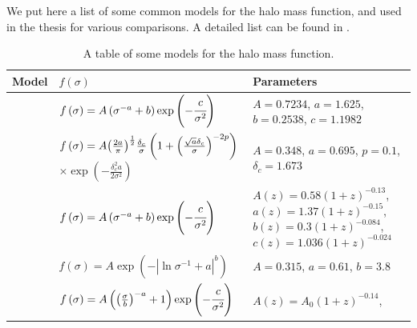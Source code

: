 We put here a list of some common models for the halo mass function, and
used in the thesis for various comparisons. A detailed list can be found in
\citet{Murray+13}.
%
\begin{table}[htb]
    \centering
    \caption{A table of some models for the halo mass
    function.\label{tab:hmf}}
    \begin{tabular}{cp{6.5cm}p{5cm}}
        \toprule
        Model & $f \left(\sigma\right)$ & Parameters\\
        \midrule
        \citet{Warren+06} &
        $f\left(\sigma\right)=
        A\left(\sigma^{-a}+b\right)\exp\left(-\cfrac{c}{\sigma^2}\right)$ &
        $A=0.7234$, \newline
        $a=1.625$, \newline
        $b=0.2538$, \newline
        $c=1.1982$
        \\
        \citet{Courtin+11} &
        $f\left(\sigma\right)=
        A{\left(\frac{2a}{\pi}\right)}^{\frac{1}{2}}
        \frac{\delta_c}{\sigma}\left(1+
        {\left(\frac{\sqrt{a}\delta_c}{\sigma}\right)}^{-2p}\right)$\newline
        $\times\exp\left(-\frac{\delta_c^2{a}}{2\sigma^2}\right)$ &
        $A=0.348$, \newline
        $a=0.695$, \newline
        $p=0.1$, \newline
        $\delta_c=1.673$ \\
        \citet{Crocce+10} &
        $f\left(\sigma\right)=
        A\left(\sigma^{-a}+b\right)\exp\left(-\cfrac{c}{\sigma^2}\right)$ &
        $A\left(z\right)=0.58{\left(1+z\right)}^{-0.13}$,\newline
        $a\left(z\right)=1.37{\left(1+z\right)}^{-0.15}$,\newline
        $b\left(z\right)=0.3{\left(1+z\right)}^{-0.084}$,\newline
        $c\left(z\right)=1.036{\left(1+z\right)}^{-0.024}$
        \\
        \citet{Jenkins+01} &
        $f\left(\sigma\right)=
        A\exp\left(-\left|\ln\sigma^{-1}+a\right|^b\right)$ &
        $A=0.315$, \newline
        $a=0.61$, \newline
        $b=3.8$ \\
        \citet{Tinker+08} &
        $f\left(\sigma\right)=
        A\left({\left(\frac{\sigma}{b}\right)}^{-a}+1\right)
        \exp\left(-\cfrac{c}{\sigma^2}\right)$ &
        $A\left(z\right)=A_0{\left(1+z\right)}^{-0.14}$,\newline

\end{tabular}
\end{table}
